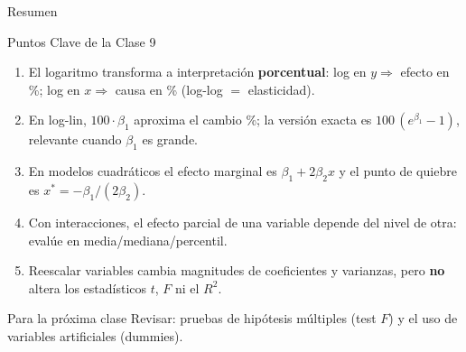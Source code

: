 \documentclass{beamer}
\begin{document}
\begin{frame}{Resumen}

\begin{block}{Puntos Clave de la Clase 9}
\begin{enumerate}
    \item El logaritmo transforma a interpretación \textbf{porcentual}: log en $y\Rightarrow$ efecto en \%; log en $x\Rightarrow$ causa en \% (log-log $=$ elasticidad).
    \item En log-lin, $100\cdot\beta_1$ aproxima el cambio \%; la versión exacta es $100\,(e^{\beta_1}-1)$, relevante cuando $\beta_1$ es grande.
    \item En modelos cuadráticos el efecto marginal es $\beta_1+2\beta_2 x$ y el punto de quiebre es $x^*=-\beta_1/(2\beta_2)$.
    \item Con interacciones, el efecto parcial de una variable depende del nivel de otra: evalúe en media/mediana/percentil.
    \item Reescalar variables cambia magnitudes de coeficientes y varianzas, pero \textbf{no} altera los estadísticos $t$, $F$ ni el $R^2$.
\end{enumerate}
\end{block}

\begin{alertblock}{Para la próxima clase}
Revisar: pruebas de hipótesis múltiples (test $F$) y el uso de variables artificiales (dummies).
\end{alertblock}

\end{frame}
\end{document}
